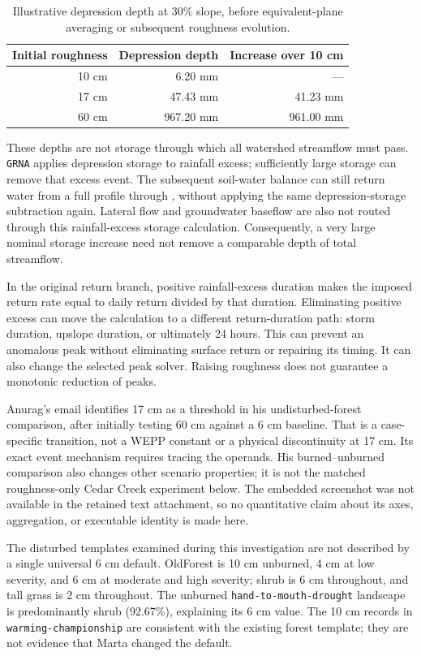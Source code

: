 \begin{table}[H]
\centering
\caption{Illustrative depression depth at 30\% slope, before equivalent-plane
averaging or subsequent roughness evolution.}
\begin{tabular}{rrr}
\toprule
Initial roughness & Depression depth & Increase over 10 cm \\
\midrule
10 cm & 6.20 mm & --- \\
17 cm & 47.43 mm & 41.23 mm \\
60 cm & 967.20 mm & 961.00 mm \\
\bottomrule
\end{tabular}
\end{table}

These depths are not storage through which all watershed streamflow must pass.
\texttt{GRNA} applies depression storage to rainfall excess; sufficiently large
storage can remove that excess event. The subsequent soil-water balance can
still return water from a full profile through \surdra{}, without applying the
same depression-storage subtraction again. Lateral flow and groundwater
baseflow are also not routed through this rainfall-excess storage calculation.
Consequently, a very large nominal storage increase need not remove a
comparable depth of total streamflow.

In the original return branch, positive rainfall-excess duration makes the
imposed return rate equal to daily return divided by that duration. Eliminating
positive excess can move the calculation to a different return-duration path:
storm duration, upslope duration, or ultimately 24 hours. This can prevent an
anomalous peak without eliminating surface return or repairing its timing.
It can also change the selected peak solver. Raising roughness does not
guarantee a monotonic reduction of peaks.

Anurag's email identifies 17 cm as a threshold in his undisturbed-forest
comparison, after initially testing 60 cm against a 6 cm baseline. That is a
case-specific transition, not a WEPP constant or a physical discontinuity at
17 cm. Its exact event mechanism requires tracing the operands. His
burned--unburned comparison also changes other scenario properties; it is not
the matched roughness-only Cedar Creek experiment below. The embedded screenshot
was not available in the retained text attachment, so no quantitative claim
about its axes, aggregation, or executable identity is made here.

The disturbed templates examined during this investigation are not described
by a single universal 6 cm default. OldForest is 10 cm unburned, 4 cm at low
severity, and 6 cm at moderate and high severity; shrub is 6 cm throughout,
and tall grass is 2 cm throughout. The unburned
\texttt{hand-to-mouth-drought} landscape is predominantly shrub (92.67\%),
explaining its 6 cm value. The 10 cm records in
\texttt{warming-championship} are consistent with the existing forest template;
they are not evidence that Marta changed the default.

